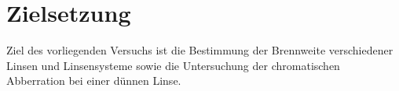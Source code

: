 \section{Zielsetzung}
\label{sec:Zielsetzung}
Ziel des vorliegenden Versuchs ist die Bestimmung der Brennweite verschiedener Linsen und Linsensysteme sowie die Untersuchung der chromatischen Abberration bei einer dünnen Linse.
